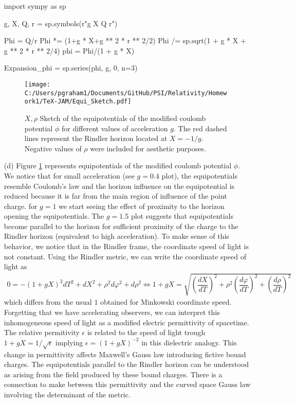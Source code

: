 \documentclass[10pt, a4paper]{article}
\begin{document}
\begin{enumerate}
  \begin{python}
import sympy as sp 

g, X, Q, r  = sp.symbols(r"g X Q r")

Phi = Q/r
Phi *= (1+g * X+g ** 2 * r ** 2/2)
Phi /= sp.sqrt(1 + g * X + g ** 2 * r ** 2/4)
phi = Phi/(1 + g * X)

Expansion_phi = sp.series(phi, g, 0, n=3)
  \end{python}
  \begin{figure}[h!]
    \centering
    \texttt{[image: C:/Users/pgraham1/Documents/GitHub/PSI/Relativity/Homework1/TeX-JAM/Equi\_Sketch.pdf]}
    \caption{$X, \rho$ Sketch of the equipotentials of the modified coulomb potential $\phi$ for different values of acceleration $g$. The red dashed lines represent the Rindler horizon located at $X=-1/g$. Negative values of $\rho$ were included for aesthetic purposes.}
    \label{equi}
  \end{figure}
  \item[(d)] Figure \ref{equi} represents equipotentials of the modified coulomb potential $\phi$. We notice that for small acceleration (see $g=0.4$ plot), the equipotentials resemble Coulomb's law and the horizon influence on the equipotential is reduced because it is far from the main region of influence of the point charge. for $g=1$ we start seeing the effect of proximity to the horizon opening the equipotentials. The $g=1.5$ plot suggests that equipotentials become parallel to the horizon for sufficient proximity of the charge to the Rindler horizon (equivalent to high acceleration). To make sense of this behavior, we notice that in the Rindler frame, the coordinate speed of light is not constant. Using the Rindler metric, we can write the coordinate speed of light as 
  \begin{align*}
    0 = -(1+gX)^2 dT^2 + dX^2 + \rho^2 d\varphi^2 + d\rho^2 \iff 1+gX = \sqrt{\left(\dfrac{dX}{dT}\right)^2 + \rho^2 \left(\dfrac{d\varphi}{dT}\right)^2 + \left(\dfrac{d\rho}{dT}\right)^2}  
  \end{align*}
  which differs from the usual $1$ obtained for Minkowski coordinate speed. Forgetting that we have accelerating observers, we can interpret this inhomogeneous speed of light as a modified electric permittivity of spacetime. The relative permitivity $\epsilon$ is related to the speed of light trough $1+gX = 1/\sqrt{\epsilon}$ implying $\epsilon = (1+gX)^{-2}$ in this dielectric analogy. This change in permittivity affects Maxwell's Gauss law introducing fictive bound charges. The equipotentials parallel to the Rindler horizon can be understood as arising from the field produced by these bound charges. There is a connection to make between this permittivity and the curved space Gauss law involving the determinant of the metric.


\end{enumerate}
\end{document}
